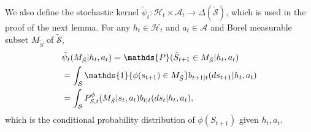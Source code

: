 \documentclass[letterpaper, 10pt]{IEEEtran}
\theoremstyle{plain}
\theoremstyle{nonumberplain}
\theoremstyle{plain}
\newcommand*\ALPHABET{\mathcal}
\newcommand*\ABSTRACT{\tilde}
\newcommand*\PR{\mathds{P}}
\newcommand*\IND{\mathds{1}}
\begin{document}
We also define the stochastic kernel $\ABSTRACT \psi_t \colon \ALPHABET H_t \times \ALPHABET A_t \to \Delta(\ABSTRACT{\ALPHABET S})$, which is used in the proof of the next lemma. 
For any $h_t \in \ALPHABET H_t$ and $a_t \in \ALPHABET A$ and  Borel measurable subset $M_{\ABSTRACT S}$ of $\ABSTRACT{\ALPHABET S}$, 
\begin{align}
    &\ABSTRACT \psi_{t}(M_{\ABSTRACT S} | h_t, a_t) = \PR(\ABSTRACT S_{t+1} \in M_{\ABSTRACT S} | h_t, a_t) \notag \\
   & = \int_{\ALPHABET S} \IND\{ \phi(s_{t+1}) \in M_{\ABSTRACT S} \} b_{t+1|t}(ds_{t+1} | h_t, a_t) \notag \\
   &= \int_{\ALPHABET S} P^{\phi}_{S,t}(M_{\ABSTRACT S} | s_t, a_t) b_{t|t}(ds_t | h_t, a_t),
   \label{eq:tilde-psi}
\end{align}
which is the conditional probability distribution of $\phi({S}_{t+1})$ given $h_t,a_t$.
\end{document}
